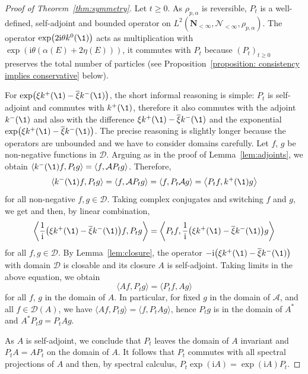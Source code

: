 \begin{proof}[Proof of Theorem~\ref{thm:symmetry}]
	Let $t \geq 0$. As $\rho_{p,\alpha}$ is reversible, $P_t$ is a well-defined, self-adjoint and bounded operator on $L^2(\mathbf N_{<\infty}, \mathcal N_{<\infty}, \rho_{p, \alpha})$. The operator $\exp\bigl(2 \mathrm i \theta k^0(\1)\bigr)$ acts as multiplication with $\exp( \mathrm i \theta (\alpha(E) + 2\eta(E)))$, it commutes with $P_t$ because $(P_t)_{t \geq 0}$ preserves the total number of particles (see Proposition~\ref{proposition: consistency implies conservative} below).
	
		For $\exp\bigl( \xi k^+(\1) - \overline{\xi} k^-(\1)\bigr)$, the short informal reasoning is simple: $P_t$ is self-adjoint and commutes with $k^+(\1)$, therefore it also commutes with the adjoint $k^-(\1)$ and also with the difference $\xi k^+(\1) - \overline{\xi} k^-(\1)$ and the exponential $\exp\bigl( \xi k^+(\1) - \overline{\xi} k^-(\1)\bigr)$. The precise reasoning is slightly longer because the operators are unbounded and we have to consider domains carefully. Let $f$, $g$ be non-negative functions in $\mathcal D$. Arguing as in the proof of Lemma~\ref{lem:adjoints}, we obtain $\langle k^-(\1) f, P_t g\rangle = \langle f, \mathcal A P_t g \rangle$. Therefore,
	\[
		\langle k^-(\1) f, P_t g\rangle = \langle f, \mathcal A P_t g \rangle = \langle f, P_t \mathcal A g\rangle = \bigl\langle P_t f, k^+(\1) g\bigr\rangle
	\]
	for all non-negative $f,g\in \mathcal D$. 	Taking complex conjugates and switching $f$ and $g$, we get  and then, by linear combination,
	\[
		\biggl \langle \frac 1{\mathrm i} \bigl(\xi k^+(\1) - \overline{\xi} k^-(\1)\bigr) f, P_t g\biggr \rangle =
		\biggl \langle P_t f, \frac 1{\mathrm i} \bigl(\xi k^+(\1) - \overline{\xi} k^-(\1)\bigr) g\biggr \rangle
	\]
	for all $f,g\in \mathcal D$. By Lemma~\ref{lem:closure}, the operator $- \mathrm {i}\bigl(\xi k^+(\1) - \overline{\xi} k^-(\1) \bigr)$ with domain $\mathcal D$ is closable and its closure $A$ is self-adjoint. 	
	Taking limits in the above equation, we obtain
	\[
		\langle A f, P_t g \rangle = \langle P_t f, A g\rangle
	\]
	for all $f$, $g$ in the domain of $A$. In particular, for fixed $g$ in the domain of $\mathcal A$, and all $f\in \mathcal D(A)$, we have $\langle A f, P_t g\rangle = \langle f, P_t A g \rangle$, hence $P_tg$ is in the domain of $A^*$ and $A^* P_t g = P_t A g$.
	
	As $A$ is self-adjoint, we conclude that $P_t$ leaves the domain of $A$ invariant and $P_t A = A P_t$ on the domain of $A$.
It follows that $P_t$ commutes with all spectral projections of $A$ \cite[Proposition~5.26]{schmudgen2012unbounded} and then, by spectral calculus, $P_t \exp(\mathrm i A) = \exp(\mathrm i A) P_t$. 	
\end{proof}
